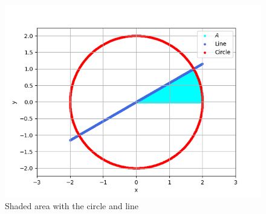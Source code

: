 \documentclass[journal]{IEEEtran}
\begin{document}
\begin{figure}[h!]
   \centering
   \includegraphics[width=0.7\columnwidth]{figs/graph.png}
    \caption{Shaded area with the circle and line}
   \label{label}
\end{figure}
\end{document}
